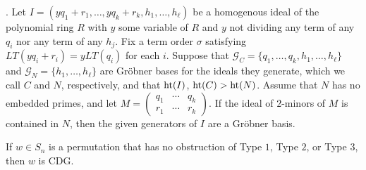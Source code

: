 \documentclass[ALCO,Unicode,published]{cedram}
\newcommand{\hgt}{{\rm{ht }}}
\begin{document}
\begin{lemma}\label{lem:mainApp}\cite[Corollary 4.13]{KR}.  
Let $I = ( yq_1+r_1,\dots, yq_k+r_k,h_1,\dots, h_\ell )$ be a homogenous ideal of the polynomial ring $R$ with $y$ some variable of $R$ and $y$ not dividing any term of any $q_i$ nor any term of any $h_j$. Fix a term order $\sigma$ satisfying $LT(yq_i+r_i) = yLT(q_i)$ for each $i$.   Suppose that $\mathcal{G}_C = \{q_1,\dots, q_k,h_1,\dots, h_\ell\}$ and $\mathcal{G}_N = \{h_1,\dots, h_\ell\}$ are Gr\"obner bases for the ideals they generate, which we call $C$ and $N$, respectively, and that $\hgt(I)$, $\hgt(C)>\hgt(N)$.  Assume that $N$ has no embedded primes, and let $M = \begin{pmatrix}
q_1& \cdots & q_k\\
r_1& \cdots & r_k
\end{pmatrix}.$ If the ideal of $2$-minors of $M$ is contained in $N$, then the given generators of $I$ are a Gr\"obner basis.
\end{lemma}

\begin{theorem}\label{thm:if}
If $w \in S_n$ is a permutation that has no obstruction of Type $1$, Type  $2$, or Type $3$, then $w$ is CDG.
\end{theorem}
\end{document}
